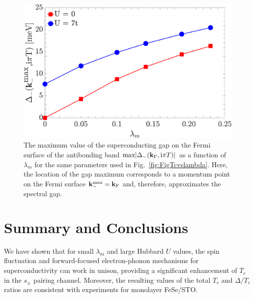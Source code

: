 \documentclass[%
 reprint,
 superscriptaddress,
nofootinbib,
nobibnotes,
 amsmath,amssymb,
 aps,
 prb,
 dvipsnames, 
 floatfix
]{revtex4-2}
\begin{document}
\begin{figure}[t]
    \centering
    \includegraphics[width=\columnwidth]{figures/Figure5.pdf}
    \caption{The maximum value of the superconducting gap on the Fermi surface of the antibonding band 
    $\text{max}|\Delta_-({\bf k}_\text{F},\text{i}\pi T)|$ as a function 
    of $\lambda_m$ for the same parameters used in Fig.~\ref{fig:FigTcvslambda}. 
    Here, the location of the gap maximum corresponds to a momentum point on the 
    Fermi surface ${\bf k}^\text{max}_- = {\bf k}_\mathrm{F}$ and, therefore, 
    approximates the spectral gap. 
    } 
    \label{fig:FigDeltavslambda}
\end{figure}

\section{Summary and Conclusions}
\label{Sec:Outlook}
We have shown that for small $\lambda_m$ and large Hubbard $U$ values, the spin fluctuation and forward-focused electron-phonon mechanisms for superconductivity can work in unison, providing a significant enhancement of $T_c$ in the $s_\pm$ pairing channel. Moreover, the resulting values of the total $T_c$ and $\Delta/T_c$ ratios are consistent with experiments for monolayer FeSe/STO. 
\end{document}

